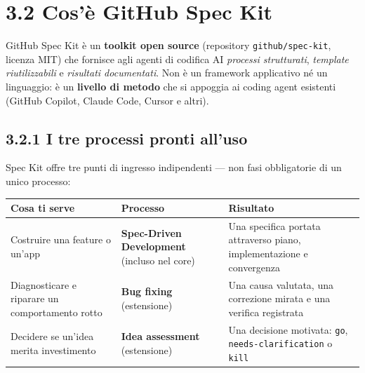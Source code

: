 \documentclass[
  italian,
  10pt,
]{book}
\newcounter{none} %
\begin{document}
\section{3.2 Cos'è GitHub Spec Kit}\label{cosuxe8-github-spec-kit}

GitHub Spec Kit è un \textbf{toolkit open source} (repository
\texttt{github/spec-kit}, licenza MIT) che fornisce agli agenti di
codifica AI \emph{processi strutturati}, \emph{template riutilizzabili}
e \emph{risultati documentati}. Non è un framework applicativo né un
linguaggio: è un \textbf{livello di metodo} che si appoggia ai coding
agent esistenti (GitHub Copilot, Claude Code, Cursor e altri).

\subsection{3.2.1 I tre processi pronti
all'uso}\label{i-tre-processi-pronti-alluso}

Spec Kit offre tre punti di ingresso indipendenti --- non fasi
obbligatorie di un unico processo:

{\def\LTcaptype{none} %
\begin{longtable}[]{@{}
  >{\raggedright\arraybackslash}p{}
  >{\raggedright\arraybackslash}p{}
  >{\raggedright\arraybackslash}p{}@{}}
\toprule\noalign{}
\begin{minipage}[b]{\linewidth}\raggedright
Cosa ti serve
\end{minipage} & \begin{minipage}[b]{\linewidth}\raggedright
Processo
\end{minipage} & \begin{minipage}[b]{\linewidth}\raggedright
Risultato
\end{minipage} \\
\midrule\noalign{}
\endhead
\bottomrule\noalign{}
\endlastfoot
Costruire una feature o un'app & \textbf{Spec-Driven Development}
(incluso nel core) & Una specifica portata attraverso piano,
implementazione e convergenza \\
Diagnosticare e riparare un comportamento rotto & \textbf{Bug fixing}
(estensione) & Una causa valutata, una correzione mirata e una verifica
registrata \\
Decidere se un'idea merita investimento & \textbf{Idea assessment}
(estensione) & Una decisione motivata: \texttt{go},
\texttt{needs-clarification} o \texttt{kill} \\
\end{longtable}
}
\end{document}
